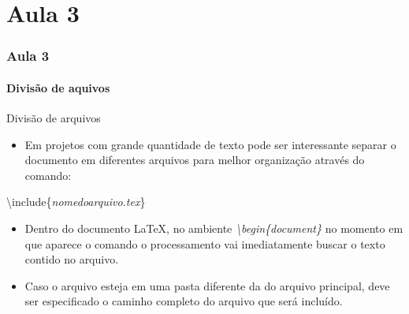 \part{Aula 3}
\section{Aula 3}

\subsection{Divisão de aquivos}
\begin{frame}{Divisão de arquivos}

      \begin{itemize}
    \item Em projetos com grande quantidade de texto pode ser interessante separar o documento em diferentes arquivos para melhor organização através do comando:    
    \end{itemize}

    \alert{\textbackslash include\{\textit{nomedoarquivo.tex}\}}

    \begin{itemize}
     \item Dentro do documento \LaTeX, no ambiente \textit{\textbackslash begin\{document\}} no momento em que aparece o comando o processamento vai imediatamente buscar o texto contido no arquivo.
    \end{itemize}

    \begin{itemize}
     \item Caso o arquivo esteja em uma pasta diferente da do arquivo principal, deve ser especificado o caminho completo do arquivo que será incluído.
    \end{itemize}

\end{frame}
  
